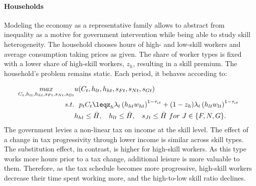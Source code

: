 \paragraph{Households}
Modeling the economy as a representative family allows to abstract from inequality as a motive for government intervention while being able to study skill heterogeneity.
 The household chooses hours of high- and low-skill workers and average consumption taking prices as given. The share of worker types is fixed with a lower share of high-skill workers, $z_h$, resulting in a skill premium. The household's problem remains static. Each period, it behaves according to: %

\begin{align}
\underset{C_{t}, h_{lt}, h_{ht}, s_{Ft}, s_{Nt}, s_{Gt}}{max}&
u(C_{t}, h_{lt}, h_{ht}, s_{Ft}, s_{Nt}, s_{Gt})\\
s.t.& \ \ p_{t}C_{t}\leq%
z_h\lambda_t \left(h_{ht}w_{ht}\right)^{1-\tau_{\iota t}}+(1-z_h)\lambda_t\left(h_{lt}w_{lt}\right)^{1-\tau_{\iota t}}\\ %
\ & h_{ht}\leq \bar{H},\ \hspace{2mm} h_{lt}\leq \bar{H},\ \hspace{2mm}  s_{Jt}\leq \bar{H} \ for\ J\in\{F,N,G\}.
\end{align}
The government levies a non-linear tax on income at the skill level. 
The effect of a change in tax progressivity through lower income is similar across skill types. The substitution effect, in contrast, is higher for high-skill workers. As this type works more hours prior to a tax change, additional leisure is more valuable to them. Therefore, as the tax schedule becomes more progressive, high-skill workers decrease their time spent working more, and the high-to-low skill ratio declines. 


